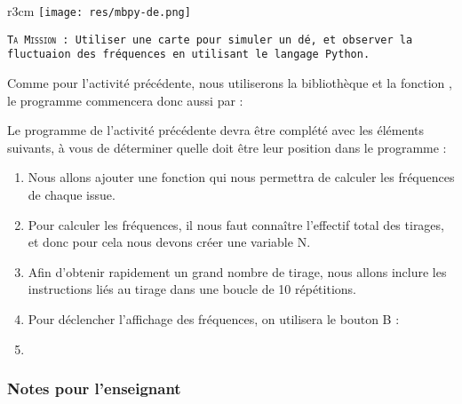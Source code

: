 \begin{wrapfigure}[5]{r}{3cm}
    \texttt{[image: res/mbpy-de.png]}
\end{wrapfigure}

\begin{eleve}    
    \texttt{\textsc{Ta Mission} : Utiliser une carte \mb  pour simuler un dé, et observer la fluctuaion des fréquences en utilisant le langage Python.}

Comme pour l'activité précédente, nous utiliserons la bibliothèque  et la fonction , le programme commencera donc aussi par :
     
Le programme de l'activité précédente devra être complété avec les éléments suivants, à vous de déterminer quelle doit être leur position dans le programme :

    \begin{enumerate}
    
    \item Nous allons ajouter une fonction qui nous permettra de calculer les fréquences de chaque issue.
    
    
    \item Pour calculer les fréquences, il nous faut connaître l'effectif total des tirages, et donc pour cela nous devons créer une variable N. 
    
    \item Afin d'obtenir rapidement un grand nombre de tirage, nous allons inclure les instructions liés au tirage dans une boucle de 10 répétitions.
    
    \item Pour déclencher l'affichage des fréquences, on utilisera le bouton B :
    
    
    \item 
    
    \end{enumerate}
    
    
    

\end{eleve}

\newpage

\subsubsection{Notes pour l'enseignant}


